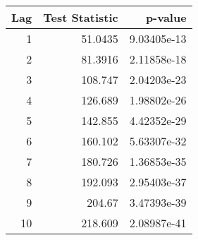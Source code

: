 \begin{tabular}{rrr}
\toprule
   Lag &   Test Statistic &     p-value \\
\midrule
     1 &          51.0435 & 9.03405e-13 \\
     2 &          81.3916 & 2.11858e-18 \\
     3 &         108.747  & 2.04203e-23 \\
     4 &         126.689  & 1.98802e-26 \\
     5 &         142.855  & 4.42352e-29 \\
     6 &         160.102  & 5.63307e-32 \\
     7 &         180.726  & 1.36853e-35 \\
     8 &         192.093  & 2.95403e-37 \\
     9 &         204.67   & 3.47393e-39 \\
    10 &         218.609  & 2.08987e-41 \\
\bottomrule
\end{tabular}